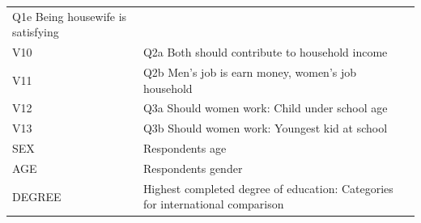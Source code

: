 \documentclass[
  finnish,
]{book}
\begin{document}
\begin{longtable}[]{@{}ll@{}}
\begin{minipage}[t]{0.85\columnwidth}
Q1e Being housewife is satisfying\strut
\end{minipage}\tabularnewline
\begin{minipage}[t]{0.09\columnwidth}\raggedright
V10\strut
\end{minipage} & \begin{minipage}[t]{0.85\columnwidth}\raggedright
Q2a Both should contribute to household income\strut
\end{minipage}\tabularnewline
\begin{minipage}[t]{0.09\columnwidth}\raggedright
V11\strut
\end{minipage} & \begin{minipage}[t]{0.85\columnwidth}\raggedright
Q2b Men's job is earn money, women's job household\strut
\end{minipage}\tabularnewline
\begin{minipage}[t]{0.09\columnwidth}\raggedright
V12\strut
\end{minipage} & \begin{minipage}[t]{0.85\columnwidth}\raggedright
Q3a Should women work: Child under school age\strut
\end{minipage}\tabularnewline
\begin{minipage}[t]{0.09\columnwidth}\raggedright
V13\strut
\end{minipage} & \begin{minipage}[t]{0.85\columnwidth}\raggedright
Q3b Should women work: Youngest kid at school\strut
\end{minipage}\tabularnewline
\begin{minipage}[t]{0.09\columnwidth}\raggedright
SEX\strut
\end{minipage} & \begin{minipage}[t]{0.85\columnwidth}\raggedright
Respondents age\strut
\end{minipage}\tabularnewline
\begin{minipage}[t]{0.09\columnwidth}\raggedright
AGE\strut
\end{minipage} & \begin{minipage}[t]{0.85\columnwidth}\raggedright
Respondents gender\strut
\end{minipage}\tabularnewline
\begin{minipage}[t]{0.09\columnwidth}\raggedright
DEGREE\strut
\end{minipage} & \begin{minipage}[t]{0.85\columnwidth}\raggedright
Highest completed degree of education: Categories for international
comparison\strut

\end{minipage}
\end{longtable}
\end{document}
